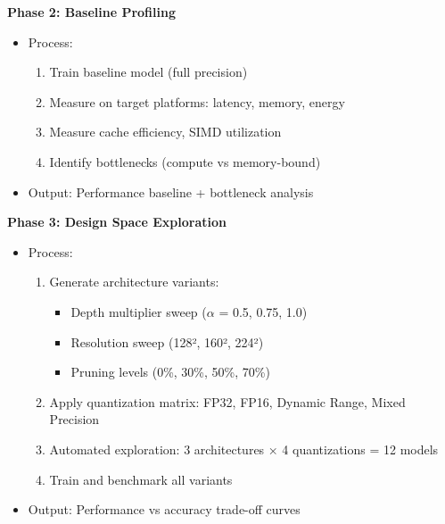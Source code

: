 \documentclass[10pt, a4paper]{article}
\begin{document}
\textbf{Phase 2: Baseline Profiling}
\begin{itemize}
    \item Process:
    \begin{enumerate}
        \item Train baseline model (full precision)
        \item Measure on target platforms: latency, memory, energy
        \item Measure cache efficiency, SIMD utilization
        \item Identify bottlenecks (compute vs memory-bound)
    \end{enumerate}
    \item Output: Performance baseline + bottleneck analysis
\end{itemize}

\textbf{Phase 3: Design Space Exploration}
\begin{itemize}
    \item Process:
    \begin{enumerate}
        \item Generate architecture variants:
        \begin{itemize}
            \item Depth multiplier sweep ($\alpha$ = 0.5, 0.75, 1.0)
            \item Resolution sweep (128², 160², 224²)
            \item Pruning levels (0\%, 30\%, 50\%, 70\%)
        \end{itemize}
        \item Apply quantization matrix: FP32, FP16, Dynamic Range, Mixed Precision
        \item Automated exploration: 3 architectures × 4 quantizations = 12 models
        \item Train and benchmark all variants
    \end{enumerate}
    \item Output: Performance vs accuracy trade-off curves
\end{itemize}
\end{document}
